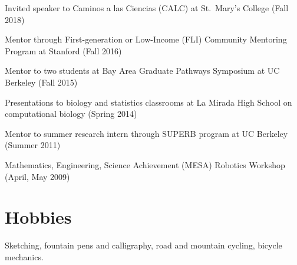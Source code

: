 \documentclass[11pt,notitlepage]{article} %
\begin{document}
\medskip
Invited speaker to Caminos a las Ciencias (CALC) at St.\ Mary's College (Fall 2018)

\medskip

Mentor through First-generation or Low-Income (FLI) Community Mentoring Program at Stanford (Fall 2016)

\medskip

Mentor to two students at Bay Area Graduate Pathways Symposium at UC Berkeley (Fall 2015)

\medskip
Presentations to biology and statistics classrooms at La Mirada High School on
computational biology (Spring 2014)

\medskip

Mentor to summer research intern through SUPERB program at UC Berkeley (Summer
2011)

\medskip

Mathematics, Engineering, Science Achievement (MESA) Robotics Workshop (April, May 2009)

\bigskip
\section*{Hobbies}
\medskip
Sketching, fountain pens and calligraphy, road and mountain cycling, bicycle mechanics.
\end{document}
